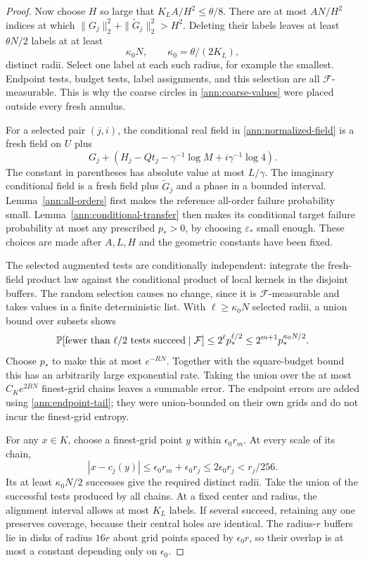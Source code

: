 \begin{proof}
Now choose \(H\) so large that
\(K_LA/H^2\le\theta/8\).
There are at most \(AN/H^2\) indices at which
\(\|G_j\|_2^2+\|\widetilde G_j\|_2^2>H^2\).
Deleting their labels leaves at least \(\theta N/2\) labels
at at least
\[
 \kappa_0N,\qquad \kappa_0=\theta/(2K_L),
\]
distinct radii.  Select one label at each such radius, for example
the smallest.  Endpoint tests, budget tests, label assignments, and
this selection are all \(\mathcal F\)-measurable.  This is why
the coarse circles in \eqref{ann:coarse-values} were placed outside
every fresh annulus.

For a selected pair \((j,i)\), the conditional real field in
\eqref{ann:normalized-field} is a fresh field on \(U\) plus
\[
 G_j+\left(H_j-Qt_j-\gamma^{-1}\log M
                                  +i\gamma^{-1}\log4\right).
\]
The constant in parentheses has absolute value at most \(L/\gamma\).
The imaginary conditional field is a fresh field plus
\(\widetilde G_j\) and a phase in a bounded interval.
Lemma~\ref{ann:all-orders} first makes the reference all-order
failure probability small.  Lemma~\ref{ann:conditional-transfer}
then makes its conditional target failure probability at most any
prescribed \(p_*>0\), by choosing \(\varepsilon_*\) small enough.
These choices are made after
\(A,L,H\) and the geometric constants have been fixed.

The selected augmented tests are conditionally independent:
integrate the fresh-field product law against the conditional
product of local kernels in the disjoint buffers.  The random
selection causes no change, since it is \(\mathcal F\)-measurable
and takes values in a finite deterministic list.
With \(\ell\ge\kappa_0N\) selected radii, a union bound over
subsets shows
\begin{equation}
 \PP[\text{fewer than }\ell/2\text{ tests succeed}\mid\mathcal F]
 \le 2^\ell p_*^{\ell/2}
 \le 2^{m+1}p_*^{\kappa_0N/2}.
 \label{ann:bernoulli-tail}
\end{equation}
Choose \(p_*\) to make this at most \(e^{-RN}\).
Together with the square-budget bound this has an arbitrarily
large exponential rate.  Taking the union over the at most
\(C_Ke^{2BN}\) finest-grid chains leaves a summable error.
The endpoint errors are added using \eqref{ann:endpoint-tail};
they were union-bounded on their own grids and do not incur the
finest-grid entropy.

For any \(x\in K\), choose a finest-grid point \(y\) within
\(\epsilon_0r_m\).  At every scale of its chain,
\[
 |x-c_j(y)|\le\epsilon_0r_m+\epsilon_0r_j
                  \le 2\epsilon_0r_j<r_j/256.
\]
Its at least \(\kappa_0N/2\) successes give the required distinct
radii.  Take the union of the successful tests produced by all
chains.  At a fixed center and radius, the alignment interval
allows at most \(K_L\) labels.  If several succeed, retaining any
one preserves coverage, because their central holes are identical.
The radius-\(r\) buffers lie in disks of radius \(16r\) about
grid points spaced by \(\epsilon_0r\), so their overlap is at
most a constant depending only on \(\epsilon_0\).


\end{proof}
